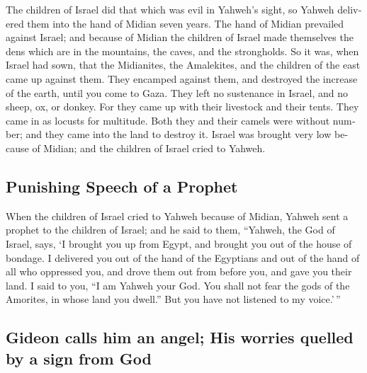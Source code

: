 \begin{paracol}{2}
\begin{otherlanguage}{english}
 The children of Israel did that which was evil in
Yahweh's sight, so Yahweh delivered them into the hand of Midian seven
years.  The hand of Midian prevailed against Israel; and
because of Midian the children of Israel made themselves the dens which
are in the mountains, the caves, and the strongholds.  So
it was, when Israel had sown, that the Midianites, the Amalekites, and
the children of the east came up against them.  They
encamped against them, and destroyed the increase of the earth, until
you come to Gaza. They left no sustenance in Israel, and no sheep, ox,
or donkey.  For they came up with their livestock and
their tents. They came in as locusts for multitude. Both they and their
camels were without number; and they came into the land to destroy it.
 Israel was brought very low because of Midian; and the
children of Israel cried to Yahweh.

\hypertarget{punishing-speech-of-a-prophet}{%
\subsection{Punishing Speech of a
Prophet}\label{punishing-speech-of-a-prophet}}

 When the children of Israel cried to Yahweh because of
Midian,  Yahweh sent a prophet to the children of Israel;
and he said to them, ``Yahweh, the God of Israel, says, `I brought you
up from Egypt, and brought you out of the house of bondage.
 I delivered you out of the hand of the Egyptians and out
of the hand of all who oppressed you, and drove them out from before
you, and gave you their land.  I said to you, ``I am
Yahweh your God. You shall not fear the gods of the Amorites, in whose
land you dwell.'' But you have not listened to my voice.'\,''

\hypertarget{gideon-calls-him-an-angel-his-worries-quelled-by-a-sign-from-god}{%
\subsection{Gideon calls him an angel; His worries quelled by a sign
from
God}\label{gideon-calls-him-an-angel-his-worries-quelled-by-a-sign-from-god}}


\end{otherlanguage}
\end{paracol}

